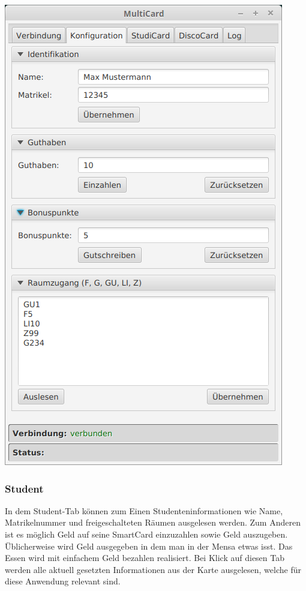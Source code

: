 \begin{center}
	\includegraphics[scale=0.4]{Images/ConfigurationTab}
\end{center}


\subsubsection{Student}
In dem Student-Tab können zum Einen Studenteninformationen wie Name, Matrikelnummer und freigeschalteten Räumen ausgelesen werden.
Zum Anderen ist es möglich Geld auf seine SmartCard einzuzahlen sowie Geld auszugeben.
Üblicherweise wird Geld ausgegeben in dem man in der Mensa etwas isst.
Das Essen wird mit einfachem Geld bezahlen realisiert.
Bei Klick auf diesen Tab werden alle aktuell gesetzten Informationen aus der Karte ausgelesen, welche für diese Anwendung relevant sind.

